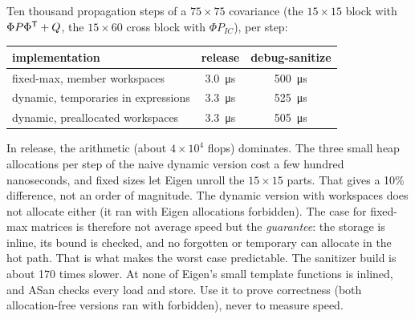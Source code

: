 \begin{solutions}
  \item Ten thousand propagation steps of a $75\times75$ covariance (the $15\times15$ block with $\Phi P\Phi^{\mathsf{T}} + Q$, the $15\times60$ cross block with $\Phi P_{IC}$), per step:
        \begin{center}\small
        \begin{tabular}{@{}l c c@{}}
        \toprule
        implementation & release & debug-sanitize \\
        \midrule
        fixed-max, member workspaces & \SI{3.0}{\micro\second} & \SI{500}{\micro\second} \\
        dynamic, temporaries in expressions & \SI{3.3}{\micro\second} & \SI{525}{\micro\second} \\
        dynamic, preallocated workspaces & \SI{3.3}{\micro\second} & \SI{505}{\micro\second} \\
        \bottomrule
        \end{tabular}
        \end{center}
        In release, the arithmetic (about $4\times10^4$ flops) dominates. The three small heap allocations per step of the naive dynamic version cost a few hundred
        nanoseconds, and fixed sizes let Eigen unroll the $15\times15$ parts. That gives a 10\% difference, not an order of magnitude. The dynamic version with workspaces does not allocate
        either (it ran with Eigen allocations forbidden). The case for fixed-max matrices is therefore not average speed but the \emph{guarantee}: the storage is
        inline, its bound is checked, and no forgotten  or temporary can allocate in the hot path. That is what makes the worst case predictable. The
        sanitizer build is about 170 times slower. At  none of Eigen's small template functions is inlined, and ASan checks every load and store. Use it to
        prove correctness (both allocation-free versions ran with  forbidden), never to measure speed.


\end{solutions}
